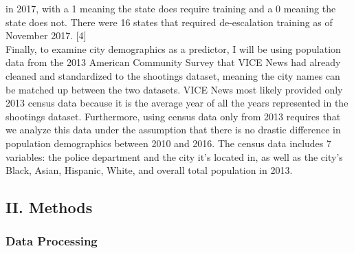 \documentclass[
]{article}
\begin{document}
in 2017, with a 1 meaning the state does require training and a 0
meaning the state does not. There were 16 states that required
de-escalation training as of November 2017. {[}4{]}\\
\hspace*{0.333em}\hspace*{0.333em}\hspace*{0.333em}\hspace*{0.333em}\hspace*{0.333em}\hspace*{0.333em}Finally,
to examine city demographics as a predictor, I will be using population
data from the 2013 American Community Survey that VICE News had already
cleaned and standardized to the shootings dataset, meaning the city
names can be matched up between the two datasets. VICE News most likely
provided only 2013 census data because it is the average year of all the
years represented in the shootings dataset. Furthermore, using census
data only from 2013 requires that we analyze this data under the
assumption that there is no drastic difference in population
demographics between 2010 and 2016. The census data includes 7
variables: the police department and the city it's located in, as well
as the city's Black, Asian, Hispanic, White, and overall total
population in 2013.

\hypertarget{ii.-methods}{%
\subsection{II. Methods}\label{ii.-methods}}

\hypertarget{data-processing}{%
\subsubsection{Data Processing}\label{data-processing}}
\end{document}
